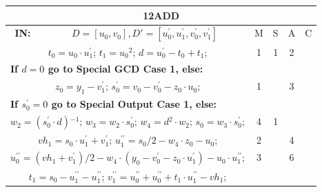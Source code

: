 \begin{tabular}{|c|cr|c|c|c|c|}
\hline
\multicolumn{7}{|c|}{\bf{12ADD}} \TS \\
\hline
\bf{IN:} &\multicolumn{2}{|c|}{$D = [u_0,v_0], D' = [u^{\prime}_0,u^{\prime}_1,v^{\prime}_0,v^{\prime}_1]$}
\TS & M & \hspace{1pt}S\hspace{1pt} & A & \hspace{1pt}C\hspace{1pt} \\
\hline
\multicolumn{3}{|R{340pt}|}{ 
$t_0=u_0 \cdot u^{\prime}_1$;\hspace{4pt}
$t_1=u_0{}^{2}$;\hspace{4pt}
$d=u^{\prime}_0-t_0+t_1$;\hspace{4pt}
} & 1 & 1 & 2 & \\
\multicolumn{3}{|l|}{ 
 \bf{If $d = 0$ go to Special GCD Case 1, else:} } &  &  &  & \\
\multicolumn{3}{|R{340pt}|}{ 
$z_0=y_1-v^{\prime}_1$;\hspace{4pt}
$s^{\prime}_0=v_0-v^{\prime}_0-z_0 \cdot u_0$;\hspace{4pt}
} & 1 &  & 3 & \\
\multicolumn{3}{|l|}{ 
 \bf{If $s^{\prime}_0 = 0$ go to Special Output Case 1, else:} } &  &  &  & \\
\multicolumn{3}{|R{340pt}|}{ 
$w_2=(s^{\prime}_0 \cdot d){}^{-1}$;\hspace{4pt}
$w_3=w_2 \cdot s^{\prime}_0$;\hspace{4pt}
$w_4=d{}^{2} \cdot w_2$;\hspace{4pt}
$s_0=w_3 \cdot s^{\prime}_0$;\hspace{4pt}
} & 4 & 1 &  & \\
\multicolumn{3}{|R{340pt}|}{ 
$vh_1=s_0 \cdot u^{\prime}_1+v^{\prime}_1$;\hspace{4pt}
$u^{\prime\prime}_1=s_0/2-w_4 \cdot z_0-u_0$;\hspace{4pt}
} & 2 &  & 4 & \\
\multicolumn{3}{|R{340pt}|}{ 
$u^{\prime\prime}_0=(vh_1+v^{\prime}_1)/2-w_4 \cdot (y_0-v^{\prime}_0-z_0 \cdot u^{\prime}_1)-u_0 \cdot u^{\prime\prime}_1$;\hspace{4pt}
} & 3 &  & 6 & \\
\multicolumn{3}{|R{340pt}|}{ 
$t_1=s_0-u^{\prime\prime}_1-u^{\prime\prime}_1$;\hspace{4pt}
$v^{\prime\prime}_1=u^{\prime\prime}_0+u^{\prime\prime}_0+t_1 \cdot u^{\prime\prime}_1-vh_1$;\hspace{4pt}
}
\end{tabular}
